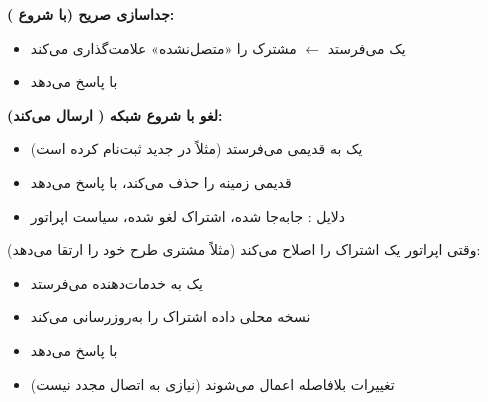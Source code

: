 \textbf{جداسازی صریح (با شروع ):}

\begin{itemize}
\tightlist
\item
   یک  می‌فرستد \ensuremath{\leftarrow}  مشترک را «متصل‌نشده» علامت‌گذاری می‌کند
\item
   با  پاسخ می‌دهد
\end{itemize}

\textbf{لغو با شروع شبکه ( ارسال می‌کند):}

\begin{itemize}
\tightlist
\item
   یک  به  قدیمی می‌فرستد (مثلاً  در  جدید ثبت‌نام کرده است)
\item
   قدیمی زمینه  را حذف می‌کند، با  پاسخ می‌دهد
\item
  دلایل :  جابه‌جا شده، اشتراک لغو شده، سیاست اپراتور
\end{itemize}


وقتی اپراتور یک اشتراک را اصلاح می‌کند (مثلاً مشتری طرح خود را ارتقا می‌دهد):

\begin{itemize}
\tightlist
\item
   یک  به  خدمات‌دهنده می‌فرستد
\item
   نسخه محلی داده اشتراک را به‌روزرسانی می‌کند
\item
   با  پاسخ می‌دهد
\item
  تغییرات بلافاصله اعمال می‌شوند (نیازی به اتصال مجدد نیست)
\end{itemize}






